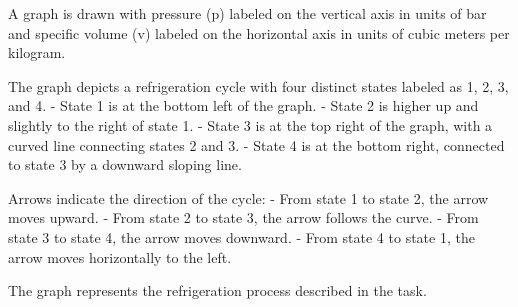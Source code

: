 A graph is drawn with pressure (p) labeled on the vertical axis in units of bar and specific volume (v) labeled on the horizontal axis in units of cubic meters per kilogram.  

The graph depicts a refrigeration cycle with four distinct states labeled as 1, 2, 3, and 4.  
- State 1 is at the bottom left of the graph.  
- State 2 is higher up and slightly to the right of state 1.  
- State 3 is at the top right of the graph, with a curved line connecting states 2 and 3.  
- State 4 is at the bottom right, connected to state 3 by a downward sloping line.  

Arrows indicate the direction of the cycle:  
- From state 1 to state 2, the arrow moves upward.  
- From state 2 to state 3, the arrow follows the curve.  
- From state 3 to state 4, the arrow moves downward.  
- From state 4 to state 1, the arrow moves horizontally to the left.  

The graph represents the refrigeration process described in the task.